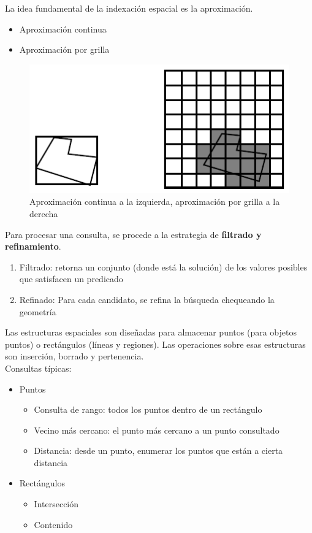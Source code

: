 \documentclass[a4paper,12pt,oneside]{report}
\begin{document}
\noindent La idea fundamental de la indexaci\'on espacial es la aproximaci\'on.
\begin{itemize}
\item Aproximaci\'on continua
\item Aproximaci\'on por grilla
\end{itemize}
\begin{figure}[h]
\begin{center}
\includegraphics[scale=0.2]{Imagenes/7.png}
\caption{Aproximaci\'on continua a la izquierda, aproximaci\'on por grilla a la derecha}
\end{center}
\end{figure}
Para procesar una consulta, se procede a la estrategia de \textbf{filtrado y refinamiento}.
\begin{enumerate}
\item Filtrado: retorna un conjunto (donde est\'a la soluci\'on) de los valores posibles que satisfacen un predicado
\item Refinado: Para cada candidato, se refina la b\'usqueda chequeando la geometr\'ia
\end{enumerate}

\noindent Las estructuras espaciales son dise\~nadas para almacenar puntos (para objetos puntos) o rect\'angulos (l\'ineas y regiones). Las operaciones sobre esas estructuras son inserci\'on, borrado y pertenencia.\\
Consultas t\'ipicas:
\begin{itemize}
\item Puntos
\begin{itemize}
\item Consulta de rango: todos los puntos dentro de un rect\'angulo
\item Vecino m\'as cercano: el punto m\'as cercano a un punto consultado
\item Distancia: desde un punto, enumerar los puntos que est\'an a cierta distancia 
\end{itemize}
\item Rect\'angulos
\begin{itemize}
\item Intersecci\'on
\item Contenido
\end{itemize}
\end{itemize}
\end{document}
